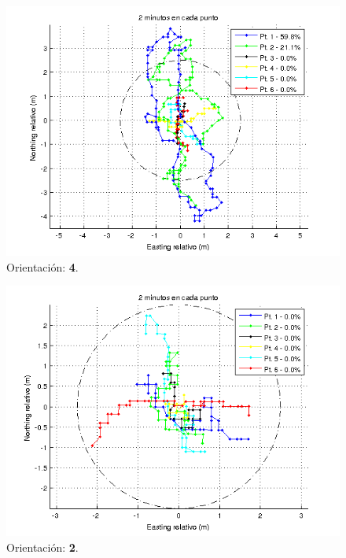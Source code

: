 \documentclass[spanish,12pt,a4paper,titlepage]{report}
\begin{document}
\newpage
\begin{figure}[h!]
  \includegraphics[width=.9\textwidth]{./img/2m_or1_todos.png}
  \caption{Orientación: \textbf{4}.}
\vspace{-30pt}
  \label{fig:2m_or1_todos.png}
\end{figure}

\begin{figure}[h!]
  \includegraphics[width=1\textwidth]{./img/2m_or2_todos.png}
  \caption{Orientación: \textbf{2}.}
  \label{fig:2m_or2_todos.png}
\end{figure}
\end{document}
